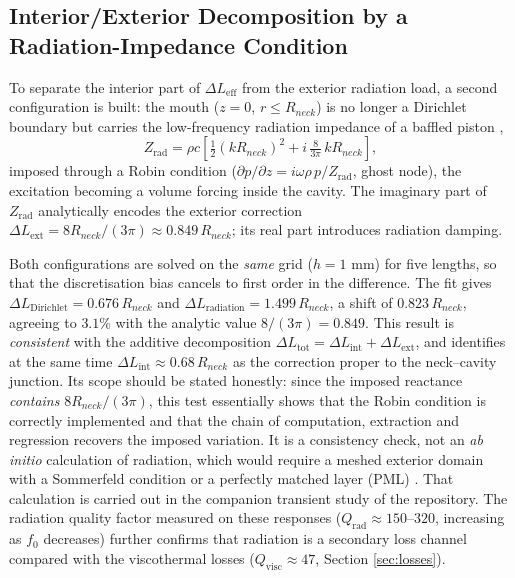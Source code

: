 \documentclass[11pt,a4paper,twocolumn]{article}
\begin{document}
\subsection{Interior/Exterior Decomposition by a Radiation-Impedance Condition}
\label{sec:radiation}
To separate the interior part of $\Delta L_{\mathrm{eff}}$ from the exterior radiation load, a second configuration is built: the mouth ($z=0$, $r\leq R_{neck}$) is no longer a Dirichlet boundary but carries the low-frequency radiation impedance of a baffled piston \cite{rayleigh1896, morse1968theoretical},
\begin{equation}
Z_{\mathrm{rad}} = \rho c\left[\tfrac{1}{2}(kR_{neck})^2 + i\,\tfrac{8}{3\pi}\,kR_{neck}\right],
\end{equation}
imposed through a Robin condition ($\partial p/\partial z = i\omega\rho\, p/Z_{\mathrm{rad}}$, ghost node), the excitation becoming a volume forcing inside the cavity. The imaginary part of $Z_{\mathrm{rad}}$ analytically encodes the exterior correction $\Delta L_{\mathrm{ext}} = 8R_{neck}/(3\pi) \approx 0.849\,R_{neck}$; its real part introduces radiation damping.

Both configurations are solved on the \emph{same} grid ($h=1$ mm) for five lengths, so that the discretisation bias cancels to first order in the difference. The fit gives $\Delta L_{\mathrm{Dirichlet}} = 0.676\,R_{neck}$ and $\Delta L_{\mathrm{radiation}} = 1.499\,R_{neck}$, a shift of $0.823\,R_{neck}$, agreeing to $3.1\%$ with the analytic value $8/(3\pi) = 0.849$. This result is \emph{consistent} with the additive decomposition $\Delta L_{\mathrm{tot}} = \Delta L_{\mathrm{int}} + \Delta L_{\mathrm{ext}}$, and identifies at the same time $\Delta L_{\mathrm{int}} \approx 0.68\,R_{neck}$ as the correction proper to the neck--cavity junction. Its scope should be stated honestly: since the imposed reactance \emph{contains} $8R_{neck}/(3\pi)$, this test essentially shows that the Robin condition is correctly implemented and that the chain of computation, extraction and regression recovers the imposed variation. It is a consistency check, not an \emph{ab initio} calculation of radiation, which would require a meshed exterior domain with a Sommerfeld condition or a perfectly matched layer (PML) \cite{berenger1994perfectly}. That calculation is carried out in the companion transient study of the repository. The radiation quality factor measured on these responses ($Q_{\mathrm{rad}} \approx 150$--$320$, increasing as $f_0$ decreases) further confirms that radiation is a secondary loss channel compared with the viscothermal losses ($Q_{\mathrm{visc}}\approx47$, Section \ref{sec:losses}).
\end{document}
